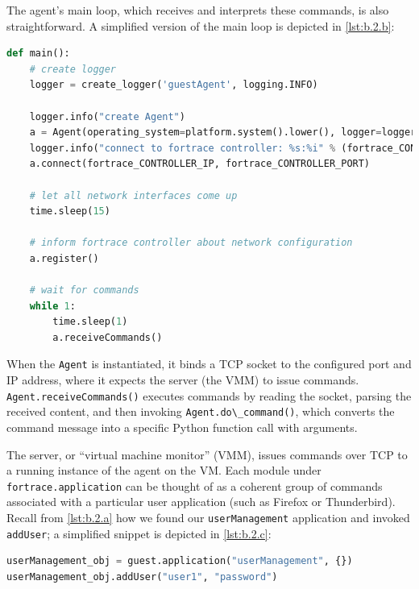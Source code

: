 \documentclass[letterpaper,12pt]{report}
\newcommand{\passthrough}[1]{#1}
\begin{document}
The agent's main loop, which receives and interprets these commands, is
also straightforward. A simplified version of the main loop is depicted
in \autoref{lst:b.2.b}:

\begin{lstlisting}[label={lst:b.2.b}, caption={Simplified ForTrace agent entry point}, language=Python]
def main():
    # create logger
    logger = create_logger('guestAgent', logging.INFO)

    logger.info("create Agent")
    a = Agent(operating_system=platform.system().lower(), logger=logger)
    logger.info("connect to fortrace controller: %s:%i" % (fortrace_CONTROLLER_IP, fortrace_CONTROLLER_PORT))
    a.connect(fortrace_CONTROLLER_IP, fortrace_CONTROLLER_PORT)

    # let all network interfaces come up
    time.sleep(15)

    # inform fortrace controller about network configuration
    a.register()

    # wait for commands
    while 1:
        time.sleep(1)
        a.receiveCommands()
\end{lstlisting}

When the \passthrough{\lstinline!Agent!} is instantiated, it binds a TCP
socket to the configured port and IP address, where it expects the
server (the VMM) to issue commands.
\passthrough{\lstinline!Agent.receiveCommands()!} executes commands by
reading the socket, parsing the received content, and then invoking
\passthrough{\lstinline!Agent.do\_command()!}, which converts the
command message into a specific Python function call with arguments.

The server, or ``virtual machine monitor'' (VMM), issues commands over
TCP to a running instance of the agent on the VM. Each module under
\passthrough{\lstinline!fortrace.application!} can be thought of as a
coherent group of commands associated with a particular user application
(such as Firefox or Thunderbird). Recall from \autoref{lst:b.2.a} how we
found our \passthrough{\lstinline!userManagement!} application and
invoked \passthrough{\lstinline!addUser!}; a simplified snippet is
depicted in \autoref{lst:b.2.c}:

\begin{lstlisting}[label={lst:b.2.c}, caption={Minimal ForTrace application API usage}, language=Python]
userManagement_obj = guest.application("userManagement", {})
userManagement_obj.addUser("user1", "password")
\end{lstlisting}
\end{document}
